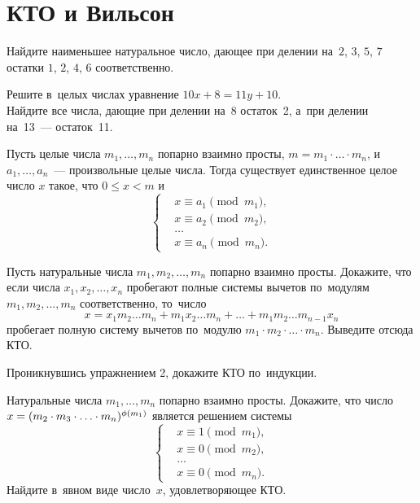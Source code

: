 
\section*{КТО и Вильсон}


\begingroup \def\eulerphi{\mathrm{\phi}}

Найдите наименьшее натуральное число, дающее при делении на~$2$, $3$, $5$, $7$
остатки $1$, $2$, $4$, $6$ соответственно.

\setcounter{jeolmsubproblem}{0}
\subproblem
Решите в~целых числах уравнение $10 x + 8 = 11 y + 10$.
\\
\subproblem
Найдите все числа, дающие при делении на~8 остаток~2, а~при делении на~13~---
остаток~11.

Пусть целые числа $m_1, \ldots, m_n$ попарно взаимно просты,
$m = m_1 \cdot \ldots \cdot m_n$, и~$a_1, \ldots, a_n$~--- произвольные целые
числа.
Тогда существует единственное целое число $x$ такое, что $0 \leq x < m$ и
\[
\left\{ \begin{aligned} &
    x \equiv a_1 \pmod{m_1}
, \\ &
    x \equiv a_2 \pmod{m_2}
, \\ & \ldots \\ &
    x \equiv a_n \pmod{m_n}
. \end{aligned} \right.
\]

\begin{problems}

\item
Пусть натуральные числа $m_1, m_2, \ldots, m_n$ попарно взаимно просты.
Докажите, что если числа $x_1, x_2, \ldots, x_n$ пробегают полные системы
вычетов по~модулям $m_1, m_2, \ldots, m_n$ соответственно, то~число
\[
    x
=
    x_1 m_2 \ldots m_n +
    m_1 x_2 \ldots m_n +
    \ldots +
    m_1 m_2 \ldots m_{n-1} x_n
\]
пробегает полную систему вычетов по~модулю
$m_1 \cdot m_2 \cdot \ldots \cdot m_n$.
Выведите отсюда КТО.

\item
Проникнувшись упражнением 2, докажите КТО по~индукции.

\item
\subproblem
Натуральные числа $m_1, \ldots, m_n$ попарно взаимно просты.
Докажите, что число
\(
    x = (m_2 \cdot m_3 \cdot \ldots \cdot m_n)^{\eulerphi(m_1)}
\)
является решением системы
\[
\left\{ \begin{aligned} &
    x \equiv 1 \pmod{m_1}
, \\ &
    x \equiv 0 \pmod{m_2}
, \\ & \ldots \\ &
    x \equiv 0 \pmod{m_n}
. \end{aligned} \right.
\]
\subproblem
Найдите в~явном виде число~$x$, удовлетворяющее КТО.

\end{problems}

